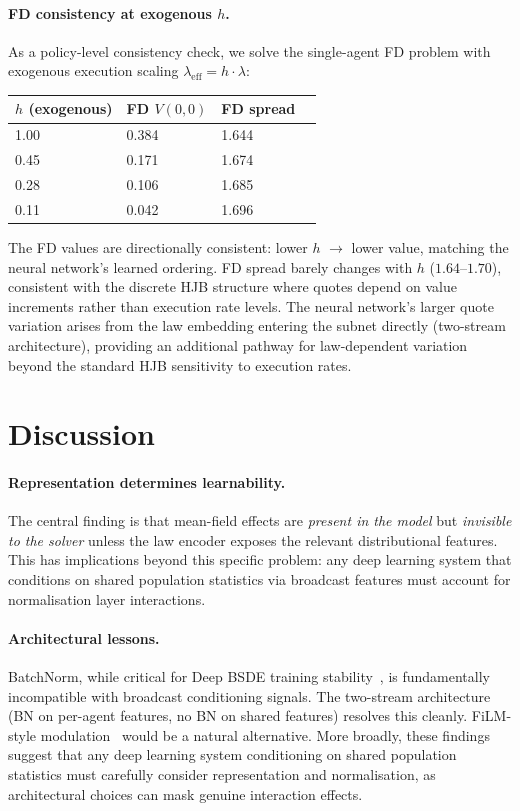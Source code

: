 \documentclass[11pt,a4paper]{article}
\begin{document}
\paragraph{FD consistency at exogenous $h$.}
As a policy-level consistency check, we solve the single-agent FD problem with exogenous execution scaling $\lambda_{\text{eff}} = h \cdot \lambda$:

\begin{center}
\begin{tabular}{llll}
\toprule
$h$ (exogenous) & FD $V(0,0)$ & FD spread \\
\midrule
1.00 & 0.384 & 1.644 \\
0.45 & 0.171 & 1.674 \\
0.28 & 0.106 & 1.685 \\
0.11 & 0.042 & 1.696 \\
\bottomrule
\end{tabular}
\end{center}

The FD values are directionally consistent: lower $h$ $\to$ lower value, matching the neural network's learned ordering. FD spread barely changes with $h$ ($1.64$--$1.70$), consistent with the discrete HJB structure where quotes depend on value increments rather than execution rate levels. The neural network's larger quote variation arises from the law embedding entering the subnet directly (two-stream architecture), providing an additional pathway for law-dependent variation beyond the standard HJB sensitivity to execution rates.

\section{Discussion}
\label{sec:discussion}

\paragraph{Representation determines learnability.}
The central finding is that mean-field effects are \emph{present in the model} but \emph{invisible to the solver} unless the law encoder exposes the relevant distributional features. This has implications beyond this specific problem: any deep learning system that conditions on shared population statistics via broadcast features must account for normalisation layer interactions.

\paragraph{Architectural lessons.}
BatchNorm, while critical for Deep BSDE training stability~\cite{han2018solving}, is fundamentally incompatible with broadcast conditioning signals. The two-stream architecture (BN on per-agent features, no BN on shared features) resolves this cleanly. FiLM-style modulation~\cite{perez2018film} would be a natural alternative. More broadly, these findings suggest that any deep learning system conditioning on shared population statistics must carefully consider representation and normalisation, as architectural choices can mask genuine interaction effects.
\end{document}
